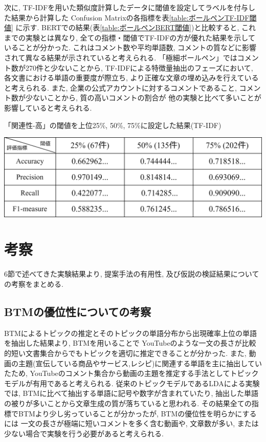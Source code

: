 \documentclass{ltjarticle}
\begin{document}
次に, TF-IDFを用いた類似度計算したデータに閾値を設定してラベルを付与した結果から計算した
Confusion Matrixの各指標を表\ref{table:ボールペンTF-IDF閾値}
に示す. 
BERTでの結果(表\ref{table:ボールペンBERT閾値})と比較すると, 
これまでの実験とは異なり, 全ての指標・閾値でTF-IDFの方が優れた結果を示していることが分かった.  
これはコメント数や平均単語数, コメントの質などに影響されて異なる結果が示されていると考えられる. 
「極細ボールペン」ではコメント数が270件と少ないことから, TF-IDFによる特徴量抽出のフェーズにおいて, 
各文書における単語の重要度が際立ち, より正確な文章の埋め込みを行えていると考えられる. 
また, 企業の公式アカウントに対するコメントであること, コメント数が少ないことから, 質の高いコメントの割合が
他の実験と比べて多いことが影響していると考えられる. 
\begin{table}[ht]
    \centering
    \caption{「関連性-高」の閾値を上位25\%, 50\%, 75\%に設定した結果(TF-IDF)}
    \vspace{5truept}

    \includegraphics[width = 13.5cm]{images/ボールペンimages/TF-IDF閾値.drawio.png}
    \label{table:ボールペンTF-IDF閾値}
\end{table}

\newpage
\section{考察}
6節で述べてきた実験結果より, 提案手法の有用性, 及び仮説の検証結果についての考察をまとめる. 
\subsection{BTMの優位性についての考察}
BTMによるトピックの推定とそのトピックの単語分布から出現確率上位の単語を抽出した結果より, BTMを用いることで
YouTubeのような一文の長さが比較的短い文書集合からでもトピックを適切に推定できることが分かった. 
また, 動画の主題(宣伝している商品やサービス,レシピ)に関連する単語を主に抽出していたため, 
YouTubeのコメント集合から動画の主題を推定する手法としてトピックモデルが有用であると考えられる. 
従来のトピックモデルであるLDAによる実験では, BTMに比べて抽出する単語に記号や数字が含まれていたり, 
抽出した単語の被りが多いことから文章生成の質が落ちていると思われる. 
その結果全ての指標でBTMより少し劣っていることが分かったが, BTMの優位性を明らかにするには
一文の長さが極端に短いコメントを多く含む動画や, 文章数が多い, または少ない場合で実験を行う必要があると考えられる. 
\end{document}

